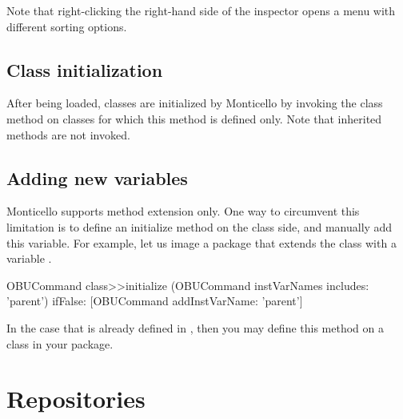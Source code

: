 \documentclass[a4paper,10pt,twoside]{book}
\begin{document}
Note that right-clicking the right-hand side of the inspector opens a menu with different sorting options.


\subsection{Class initialization}

After being loaded, classes are initialized by Monticello by invoking the  class method on classes for which this method is defined only. Note that inherited  methods are not invoked.

\subsection{Adding new variables}

Monticello supports method extension only. One way to circumvent this limitation is to define an initialize method on the class side, and manually add this variable. For example, let us image  a package that extends the class  with a variable .

\begin{code}{}
OBUCommand class>>initialize
	(OBUCommand instVarNames includes: 'parent') 
		ifFalse: [OBUCommand addInstVarName: 'parent']
\end{code}

In the case that  is already defined in , then you may define this  method on a class in your package.

\section{Repositories}
\end{document}

